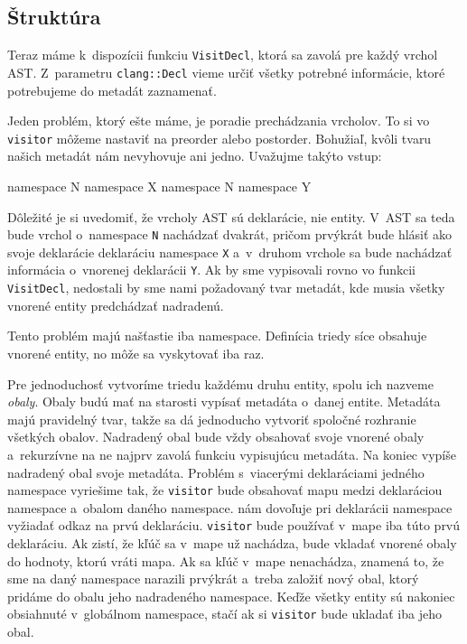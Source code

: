 \subsection{Štruktúra}

Teraz máme k~dispozícii funkciu \texttt{VisitDecl}, ktorá sa zavolá pre každý vrchol AST. Z~parametru \texttt{clang::Decl} vieme určiť všetky potrebné informácie, ktoré potrebujeme do metadát zaznamenať.

Jeden problém, ktorý ešte máme, je poradie prechádzania vrcholov. To si vo \texttt{visitor} môžeme nastaviť na preorder alebo postorder. Bohužiaľ, kvôli tvaru našich metadát nám nevyhovuje ani jedno. Uvažujme takýto vstup:
\begin{code}
namespace N { namespace X{} }
namespace N { namespace Y{} }
\end{code}
Dôležité je si uvedomiť, že vrcholy AST sú deklarácie, nie entity. V~AST sa teda bude vrchol o~namespace \texttt{N} nachádzať dvakrát, pričom prvýkrát bude hlásiť ako svoje deklarácie deklaráciu namespace \texttt{X} a~v~druhom vrchole sa bude nachádzať informácia o~vnorenej deklarácii \texttt{Y}. Ak by sme vypisovali rovno vo funkcii \texttt{VisitDecl}, nedostali by sme nami požadovaný tvar metadát, kde musia všetky vnorené entity predchádzať nadradenú.

Tento problém majú našťastie iba namespace. Definícia triedy síce obsahuje vnorené entity, no môže sa vyskytovať iba raz.

Pre jednoduchosť vytvoríme triedu každému druhu entity, spolu ich nazveme \emph{obaly}. Obaly budú mať na starosti vypísať metadáta o~danej entite. Metadáta majú pravidelný tvar, takže sa dá jednoducho vytvoriť spoločné rozhranie všetkých obalov. Nadradený obal bude vždy obsahovať svoje vnorené obaly a~rekurzívne na ne najprv zavolá funkciu vypisujúcu metadáta. Na koniec vypíše nadradený obal svoje metadáta. Problém s~viacerými deklaráciami jedného namespace vyriešime tak, že \texttt{visitor} bude obsahovať mapu medzi deklaráciou namespace a~obalom daného namespace. \Clang{} nám dovoľuje pri deklarácii namespace vyžiadať odkaz na prvú deklaráciu. \texttt{visitor} bude používať v~mape iba túto prvú deklaráciu. Ak zistí, že kľúč sa v~mape už nachádza, bude vkladať vnorené obaly do hodnoty, ktorú vráti mapa. Ak sa kľúč v~mape nenachádza, znamená to, že sme na daný namespace narazili prvýkrát a~treba založiť nový obal, ktorý pridáme do obalu jeho nadradeného namespace. Keďže všetky entity sú nakoniec obsiahnuté v~globálnom namespace, stačí ak si \texttt{visitor} bude ukladať iba jeho obal.

